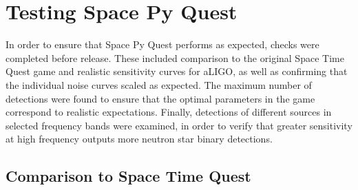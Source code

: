 \documentclass{article}
\begin{document}

\section{Testing Space Py Quest}
\label{sec:testing}
In order to ensure that Space Py Quest performs as expected, checks
were completed before release. These included comparison to the
original Space Time Quest game and realistic sensitivity curves for
aLIGO, as well as confirming that the individual noise curves scaled
as expected. The maximum number of detections were found to ensure
that the optimal parameters in the game correspond to realistic
expectations. Finally, detections of different sources in selected
frequency bands were examined, in order to verify that greater
sensitivity at high frequency outputs more neutron star binary
detections.  
\label{sec:mcmc}

\subsection{Comparison to Space Time Quest}
\end{document}
